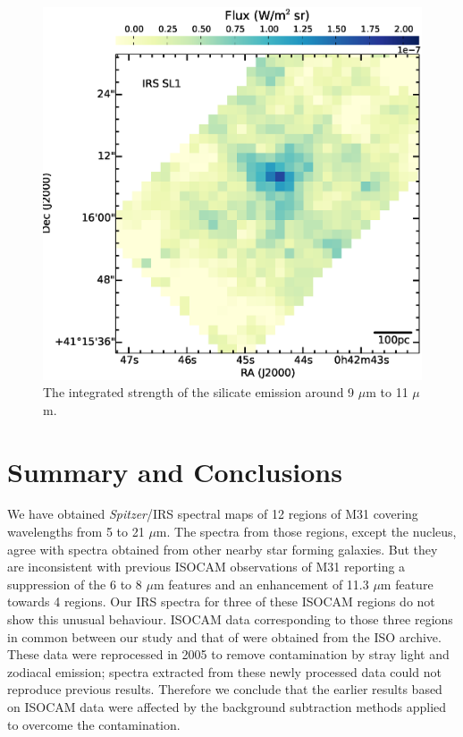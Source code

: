 \documentclass[useAMS,usenatbib,a4paper]{mn2e}
\begin{document}
\begin{figure}

\centering
\includegraphics[scale = 0.3]{./NUCsilicate.eps}
\caption{ The integrated strength of the silicate emission around 9 $\mu$m to 11 $\mu$m.}
\label{silicate}
\end{figure}


\section{Summary and Conclusions}

We have obtained {\em Spitzer}/IRS spectral maps of 12 regions of M31 covering wavelengths from 5 to 21 $\mu$m. The spectra from those regions, except the nucleus, agree with spectra obtained from other nearby  star forming galaxies. But they are inconsistent with previous ISOCAM observations of M31 \citep{1998Cesarsky} reporting a suppression of the 6 to 8 $\mu$m features and an enhancement of 11.3 $\mu$m feature towards 4 regions. Our IRS spectra for three of these ISOCAM regions do not show this unusual behaviour. ISOCAM data corresponding to those three regions in common between our study and that of \citep{1998Cesarsky} were obtained from the ISO archive. These data were reprocessed in 2005 to remove contamination by stray light and zodiacal emission; spectra extracted from these newly processed data could not reproduce previous results. Therefore we conclude that the earlier results based on ISOCAM data were affected by the background subtraction methods applied to overcome the contamination.
\end{document}
